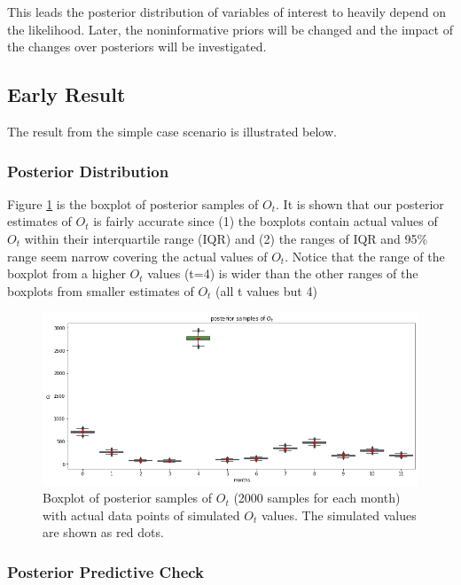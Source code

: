 \documentclass[
10pt, %
a4paper, %
oneside, %
headinclude,footinclude, %
BCOR5mm, %
]{scrartcl}
\begin{document}
This leads the posterior distribution of variables of interest to heavily depend on the likelihood. Later, the noninformative priors will be changed and the impact of the changes over posteriors will be investigated. \\

\subsection{Early Result } 

The result from the simple case scenario is illustrated below.

\subsubsection{Posterior Distribution}


Figure \ref{pst_ot} is the boxplot of posterior samples of $O_t$. It is shown that our posterior estimates of  $O_t$ is fairly accurate since (1) the boxplots contain actual values of $O_t$ within their interquartile range (IQR) and (2) the ranges of IQR and 95\% range seem narrow covering the actual values of $O_t$. Notice that the range of the boxplot from a higher $O_t$ values (t=4) is wider than the other ranges of the boxplots from smaller estimates of $O_t$ (all t values but 4)\\

\begin{figure}[h]
	\centering
	\includegraphics[width=1\linewidth]{Figures/earlyresult1_ot.png}
	\caption{Boxplot of posterior samples of $O_t$ (2000 samples for each month) with actual data points of simulated $O_t$ values. The simulated values are shown as red dots.}
	\label{pst_ot}
\end{figure}

\newpage
\subsubsection{Posterior Predictive Check}
\end{document}
